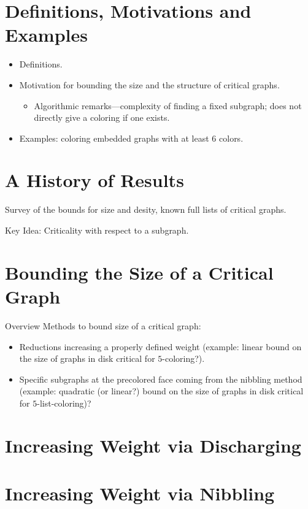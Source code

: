 \documentclass[12pt,twoside,openright,a4paper]{book}
\begin{document}

\section{Definitions, Motivations and Examples}

\begin{itemize}
\item Definitions.
\item Motivation for bounding the size and the structure of critical graphs.
\begin{itemize}
\item Algorithmic remarks---complexity of finding a fixed subgraph; does not directly
give a coloring if one exists.
\end{itemize}
\item Examples: coloring embedded graphs with at least $6$ colors.
\end{itemize}

\section{A History of Results}

Survey of the bounds for size and desity, known full lists of critical graphs.

Key Idea: Criticality with respect to a subgraph.

\section{Bounding the Size of a Critical Graph}

Overview Methods to bound size of a critical graph:
\begin{itemize}
\item Reductions increasing a properly defined weight (example: linear bound on the size of graphs in disk
critical for $5$-coloring?).
\item Specific subgraphs at the precolored face coming from the nibbling method (example: quadratic (or linear?) bound
on the size of graphs in disk critical for $5$-list-coloring)?
\end{itemize}

\section{Increasing Weight via Discharging}

\section{Increasing Weight via Nibbling}
\end{document}
